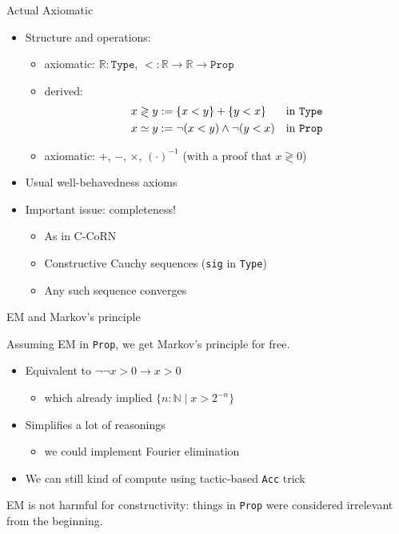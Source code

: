 \documentclass{beamer}
\begin{document}
\begin{frame}{Actual Axiomatic}

\begin{itemize}
  \item Structure and operations:
\begin{itemize}
  \item axiomatic: $\mathbb{R}:\mathtt{Type}$, $< : \mathbb{R}\rightarrow\mathbb{R}\rightarrow\mathtt{Prop}$ 
  \item derived:
  \begin{align*}
  x\gtrless y &:= \{x < y\} + \{y < x\} & \text{in \texttt{Type}}\\
  x \simeq y &:= \neg (x < y) \wedge \neg(y < x) &\text{in \texttt{Prop}}
  \end{align*}

  \item axiomatic: $+$, $-$, $\times$, $(\cdot)^{-1}$ (with a proof that $x\gtrless 0$)
\end{itemize}

  \item Usual well-behavedness axioms

  \item Important issue: completeness!
  \begin{itemize}
  \item As in C-CoRN
  \item Constructive Cauchy sequences (\texttt{sig} in \texttt{Type})
  \item Any such sequence converges
  \end{itemize}

\end{itemize}

\end{frame}

\begin{frame}{EM and Markov's principle}

Assuming EM in \texttt{Prop}, we get Markov's principle for free.

  \begin{itemize}
  \item Equivalent to $\neg\neg x > 0 \rightarrow x > 0$
  \begin{itemize}
    \item which already implied $\{n :\mathbb{N} \mid x > 2^{-n} \}$
  \end{itemize}
  \item Simplifies a lot of reasonings
  \begin{itemize}
    \item we could implement Fourier elimination
  \end{itemize}
  \item We can still kind of compute using tactic-based \texttt{Acc} trick
  \end{itemize}

EM is not harmful for constructivity: things in \texttt{Prop} were considered irrelevant from the beginning.

\end{frame}
\end{document}
